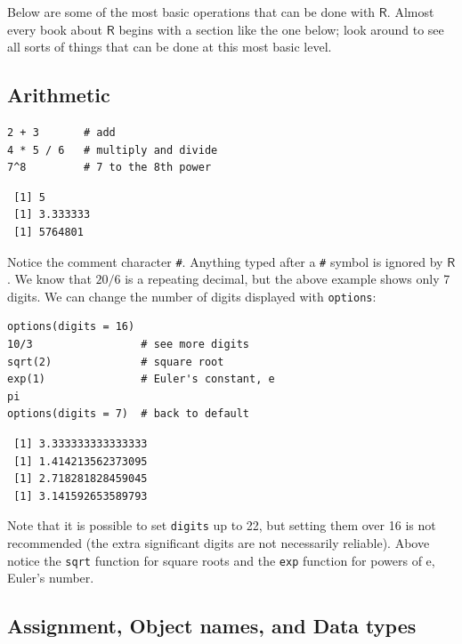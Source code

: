 \documentclass[captions=tableheading]{scrbook}
\begin{document}
Below are some of the most basic operations that can be done with \(\mathsf{R}\). Almost every book about \(\mathsf{R}\) begins with a section like the one below; look around to see all sorts of things that can be done at this most basic level.
\subsection{Arithmetic}
\label{sec-2-3-1}
\label{sub-Arithmetic}



\lstset{language=R}
\begin{lstlisting}
2 + 3       # add
4 * 5 / 6   # multiply and divide
7^8         # 7 to the 8th power
\end{lstlisting}

\begin{verbatim}
 [1] 5
 [1] 3.333333
 [1] 5764801
\end{verbatim}

Notice the comment character \texttt{\#}. Anything typed after a \texttt{\#} symbol is ignored by \(\mathsf{R}\). We know that \(20/6\) is a repeating decimal, but the above example shows only 7 digits. We can change the number of digits displayed with \texttt{options}:


\lstset{language=R}
\begin{lstlisting}
options(digits = 16)
10/3                 # see more digits
sqrt(2)              # square root
exp(1)               # Euler's constant, e
pi       
options(digits = 7)  # back to default
\end{lstlisting}

\begin{verbatim}
 [1] 3.333333333333333
 [1] 1.414213562373095
 [1] 2.718281828459045
 [1] 3.141592653589793
\end{verbatim}

Note that it is possible to set \texttt{digits} up to 22, but setting them over 16 is not recommended (the extra significant digits are not necessarily reliable). Above notice the \texttt{sqrt} function for square roots and the \texttt{exp} function for powers of \(\mathrm{e}\), Euler's number.
\subsection{Assignment, Object names, and Data types}
\label{sec-2-3-2}
\label{sub-Assignment-Object-names}
\end{document}
